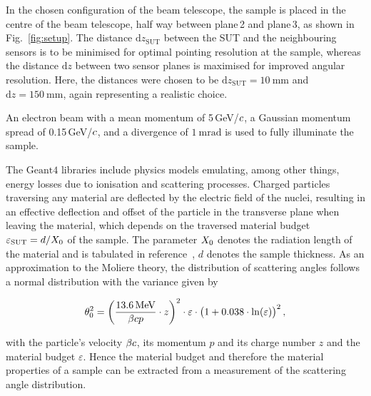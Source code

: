 \documentclass{PoS}
\newcommand{\eV}{\ensuremath{\textrm{eV}}}
\newcommand{\cspeed}{\ensuremath{\mathnormal{c}}}
\newcommand{\dz}{\ensuremath{\textrm{d}z}}
\newcommand{\dzsut}{\ensuremath{\textrm{d}z_{\textrm{SUT}}}}
\newcommand{\xzero}{\ensuremath{\mathnormal{X}_0}}
\newcommand{\Geant}{\ensuremath{\textrm{Geant4}}}
\begin{document}
In the chosen configuration of the beam telescope,
 the sample is placed in the centre of the beam telescope, half way between plane\,2 and plane\,3, as shown in Fig.~\ref{fig:setup}. %
The distance $\dzsut$ between the SUT and the neighbouring sensors is to be minimised for optimal pointing resolution at the sample,
 whereas the distance $\dz$ between two sensor planes is maximised for improved angular resolution.
Here, the distances were chosen to be $\dzsut =\SI{10}{\mm}$ and $\dz=\SI{150}{\mm}$, again representing a realistic choice. 

An electron beam with a mean momentum of 5\,GeV/$\cspeed$, a Gaussian momentum spread of 0.15\,GeV/$\cspeed$, and a divergence of $\SI{1}{\milli\radian}$ is used to fully illuminate the sample. 

The $\Geant$ libraries include physics models emulating, among other things, energy losses due to ionisation and scattering processes.
Charged particles traversing any material are deflected by the electric field of the nuclei, resulting in an effective deflection and offset of the particle in the transverse plane when leaving the material,
 which depends on the traversed material budget $\varepsilon_{\textrm{SUT}} = d / \xzero$ of the sample. 
The parameter $\xzero$ denotes the radiation length of the material and is tabulated in reference~\cite{ref:pdg2016}, $d$ denotes the sample thickness. 
As an approximation to the Moliere theory, the distribution of scattering angles follows a normal distribution with the variance given by~\cite{ref:scatteringhighland, ref:pdg2016} 

\begin{equation}
 \theta_0^2 = \left( \frac{\SI{13.6}{\mega\eV}}{\beta \cspeed p}\cdot z \right)^2 \cdot \varepsilon \cdot \big( 1+0.038\cdot\ln(\varepsilon) \big)^2\,,
 \label{eq:highland}
\end{equation}

\noindent
with the particle's velocity $\beta \cspeed$, its momentum $p$ and its charge number $z$ and the material budget $\varepsilon$. 
Hence the material budget and therefore the material properties of a sample can be extracted from a measurement of the scattering angle distribution.

\end{document}
